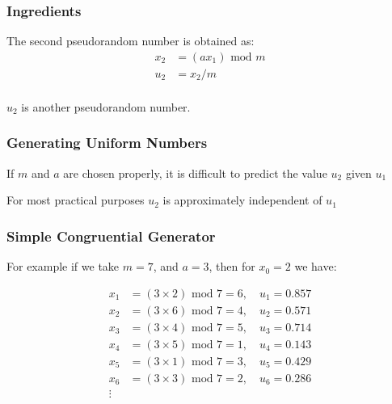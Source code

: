 \documentclass[12pt]{beamer}\usepackage[]{graphicx}\usepackage[]{color}
\begin{document}

\begin{frame}
\frametitle{Ingredients}

The second pseudorandom number is obtained as:
\begin{align*} 
x_2 &= (a x_1) \text{ mod } m \\
u_2 &= x_2 / m \\
\end{align*}

$u_2$ is another pseudorandom number.

\end{frame}


\begin{frame}
\frametitle{Generating Uniform Numbers}

\bi
  \item If $m$ and $a$ are chosen properly, it is difficult to predict the value $u_2$ given $u_1$
  \item For most practical purposes $u_2$ is approximately independent of $u_1$
\ei

\end{frame}


\begin{frame}[fragile]
\frametitle{Simple Congruential Generator}

For example if we take $m = 7$, and $a = 3$, then for $x_0 = 2$ we have:

\begin{align*} 
x_1 &= (3 \times 2) \text{ mod } 7 = 6, \quad u_1 = 0.857 \\ 
x_2 &= (3 \times 6) \text{ mod } 7 = 4, \quad u_2 = 0.571 \\
x_3 &= (3 \times 4) \text{ mod } 7 = 5, \quad u_3 = 0.714 \\
x_4 &= (3 \times 5) \text{ mod } 7 = 1, \quad u_4 = 0.143 \\ 
x_5 &= (3 \times 1) \text{ mod } 7 = 3, \quad u_5 = 0.429 \\
x_6 &= (3 \times 3) \text{ mod } 7 = 2, \quad u_6 = 0.286 \\
\vdots \\
\end{align*}

\end{frame}

\end{document}
